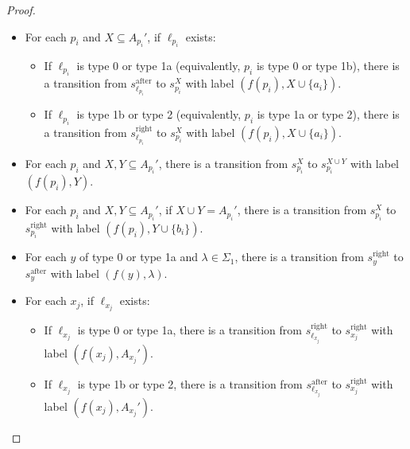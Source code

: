 \documentclass{article}
\begin{document}
\begin{proof}
\begin{itemize}
\begin{itemize}
        \item If $y_k=x_j$, then there is a transition from $s_k^{\text{start}}$ to $s_{y_k}^{\text{right}}$ with label $(f(y_k), A_{y_k}')$.
        \item If $k<K$, there is an $\varepsilon$-transition from $s_{y_k'}^{\text{right}}$ to $s_{k+1}^{\text{start}}$ and an $\varepsilon$-transition from $s_{y_k'}^{\text{after}}$ to $s_{k+1}^{\text{start}}$; if $k=K$, these transitions instead go to $s_{\text{accept}}$.
    \end{itemize}
    \item For each $p_i$ and $X\subseteq A_{p_i}'$, if $\ell_{p_i}$ exists:
    \begin{itemize}
        \item If $\ell_{p_i}$ is type 0 or type 1a (equivalently, $p_i$ is type 0 or type 1b), there is a transition from $s_{\ell_{p_i}}^{\text{after}}$ to $s_{p_i}^X$ with label $(f(p_i), X\cup\{a_i\})$.
        \item If $\ell_{p_i}$ is type 1b or type 2 (equivalently, $p_i$ is type 1a or type 2), there is a transition from $s_{\ell_{p_i}}^{\text{right}}$ to $s_{p_i}^X$ with label $(f(p_i), X\cup\{a_i\})$.
    \end{itemize}
    \item For each $p_i$ and $X,Y\subseteq A_{p_i}'$, there is a transition from $s_{p_i}^X$ to $s_{p_i}^{X\cup Y}$ with label $(f(p_i), Y)$.
    \item For each $p_i$ and $X,Y\subseteq A_{p_i}'$, if $X\cup Y=A_{p_i}'$, there is a transition from $s_{p_i}^X$ to $s_{p_i}^{\text{right}}$ with label $(f(p_i), Y\cup \{b_i\})$.
    \item For each $y$ of type 0 or type 1a and $\lambda\in\Sigma_1$, there is a transition from $s_y^{\text{right}}$ to $s_y^{\text{after}}$ with label $(f(y), \lambda)$.
    \item For each $x_j$, if $\ell_{x_j}$ exists:
    \begin{itemize}
        \item If $\ell_{x_j}$ is type 0 or type 1a, there is a transition from $s_{\ell_{x_j}}^{\text{right}}$ to $s_{x_j}^{\text{right}}$ with label $(f(x_j), A_{x_j}')$.
        \item If $\ell_{x_j}$ is type 1b or type 2, there is a transition from $s_{\ell_{x_j}}^{\text{after}}$ to $s_{x_j}^{\text{right}}$ with label $(f(x_j), A_{x_j}')$.
    \end{itemize}
\end{itemize}


\end{proof}
\end{document}
